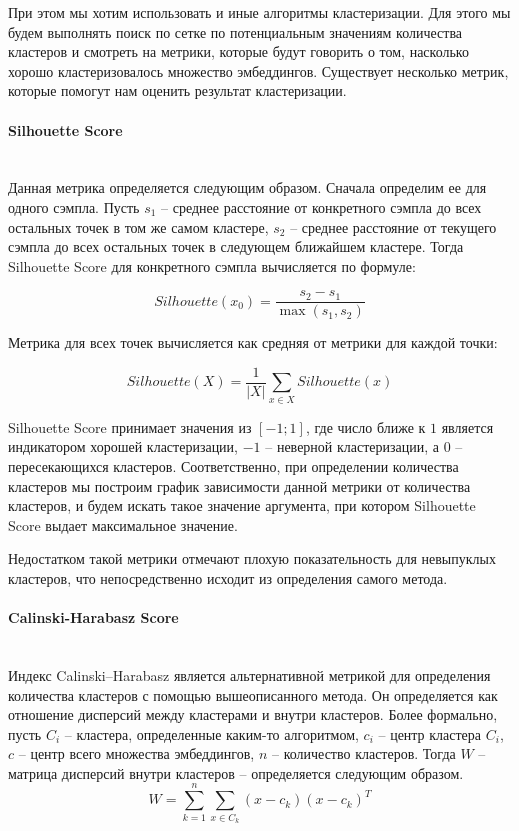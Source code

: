 При этом мы хотим использовать и иные алгоритмы кластеризации. Для этого мы будем выполнять поиск по сетке по потенциальным значениям количества кластеров и смотреть на метрики, которые будут говорить о том, насколько хорошо кластеризовалось множество эмбеддингов. Существует несколько метрик, которые помогут нам оценить результат кластеризации.

\paragraph{Silhouette Score}\mbox{} \\

Данная метрика определяется следующим образом. Сначала определим ее для одного сэмпла. Пусть $s_1$ -- среднее расстояние от конкретного сэмпла до всех остальных точек в том же самом кластере, $s_2$ -- среднее расстояние от текущего сэмпла до всех остальных точек в следующем ближайшем кластере. Тогда Silhouette Score для конкретного сэмпла вычисляется по формуле:

$$
    Silhouette(x_0) = \frac{s_2 - s_1}{\max(s_1, s_2)}
$$
\smallskip

Метрика для всех точек вычисляется как средняя от метрики для каждой точки:

$$
    Silhouette(X) = \frac{1}{|X|} \sum_{x \in X} Silhouette(x)
$$
\smallskip

Silhouette Score принимает значения из $[-1; 1]$, где число ближе к $1$ является индикатором хорошей кластеризации, $-1$ -- неверной кластеризации, а $0$ -- пересекающихся кластеров. Соответственно, при определении количества кластеров мы построим график зависимости данной метрики от количества кластеров, и будем искать такое значение аргумента, при котором Silhouette Score выдает максимальное значение.

Недостатком такой метрики отмечают плохую показательность для невыпуклых кластеров, что непосредственно исходит из определения самого метода.

\paragraph{Calinski-Harabasz Score}\mbox{} \\

Индекс Calinski–Harabasz является альтернативной метрикой для определения количества кластеров с помощью вышеописанного метода. Он определяется как отношение дисперсий между кластерами и внутри кластеров. Более формально, пусть $C_i$ -- кластера, определенные каким-то алгоритмом, $c_i$ -- центр кластера $C_i$, $c$ -- центр всего множества эмбеддингов, $n$ -- количество кластеров. Тогда $W$ -- матрица дисперсий внутри кластеров -- определяется следующим образом.
$$
W = \sum_{k = 1}^{n} \sum_{x \in C_k} (x - c_k)(x - c_k)^T
$$

